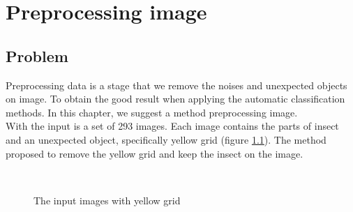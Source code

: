 \chapter{Preprocessing image}
\section{Problem}
Preprocessing data is a stage that we remove the noises and unexpected objects on image. To obtain the good result when applying the automatic classification methods. In this chapter, we suggest a method preprocessing image.\\[0.2cm]
With the input is a set of 293 images. Each image contains the parts of insect and an unexpected object, specifically yellow grid (figure \ref{fig:figure_31}). The method proposed to remove the yellow grid and keep the insect on the image.
\begin{figure}[h!]
\centering
{}~~
\caption{The input images with yellow grid}
\label{fig:figure_31}
\end{figure}
